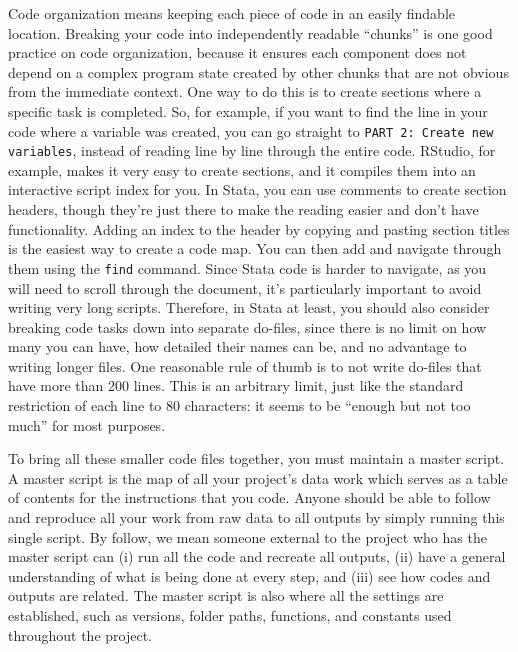 Code organization means keeping each piece of code in an easily findable location.
Breaking your code into independently readable ``chunks'' is one good practice on code organization,
because it ensures each component does not depend on a complex program state
created by other chunks that are not obvious from the immediate context.
One way to do this is to create sections where a specific task is completed.
So, for example, if you want to find the line in your code where a variable was created,
you can go straight to \texttt{PART 2: Create new variables},
instead of reading line by line through the entire code.
RStudio, for example, makes it very easy to create sections,
and it compiles them into an interactive script index for you.
In Stata, you can use comments to create section headers,
though they're just there to make the reading easier and don't have functionality.
Adding an index to the header by copying and pasting section titles is the easiest way to create a code map.
You can then add and navigate through them using the \texttt{find} command.
Since Stata code is harder to navigate, as you will need to scroll through the document,
it's particularly important to avoid writing very long scripts.
Therefore, in Stata at least, you should also consider breaking code tasks down
into separate do-files, since there is no limit on how many you can have,
how detailed their names can be, and no advantage to writing longer files.
One reasonable rule of thumb is to not write do-files that have more than 200 lines.
This is an arbitrary limit, just like the standard restriction of each line to 80 characters:
it seems to be ``enough but not too much'' for most purposes.

To bring all these smaller code files together, you must maintain a master script.
A master script is the map of all your project's data work
which serves as a table of contents for the instructions that you code.
Anyone should be able to follow and reproduce all your work from
raw data to all outputs by simply running this single script.
By follow, we mean someone external to the project who has the master script can
(i) run all the code and recreate all outputs,
(ii) have a general understanding of what is being done at every step, and
(iii) see how codes and outputs are related.
The master script is also where all the settings are established,
such as versions, folder paths, functions, and constants used throughout the project.

